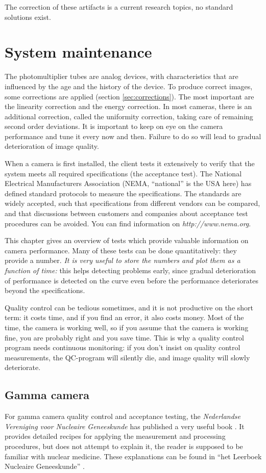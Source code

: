 \documentclass[11pt,oneside]{book}
\begin{document}
The correction of these artifacts is a current research topics, no standard
solutions exist.

\chapter{System maintenance}

The photomultiplier tubes are analog devices, with characteristics
that are influenced by the age and the history of the device. To
produce correct images, some corrections are applied (section
\ref{sec:corrections}). The most important are the linearity
correction and the energy correction. In most cameras, there is an
additional correction, called the uniformity correction, taking care
of remaining second order deviations. It is important to keep on eye
on the camera performance and tune it every now and then. Failure to
do so will lead to gradual deterioration of image quality.

When a camera is first installed, the client tests it extensively to
verify that the system meets all required specifications (the
acceptance test). The National Electrical Manufacturers Association
(NEMA, ``national'' is the USA here) has defined standard protocols to
measure the specifications. The standards are widely accepted, such
that specifications from different vendors can be compared, and that
discussions between customers and companies about acceptance test
procedures can be avoided. You can find information on {\em
http://www.nema.org}.

This chapter gives an overview of tests which provide valuable information on
camera performance. Many of these tests can be done quantitatively: they
provide a number. {\em It is very useful to store the numbers and plot them as
a function of time:} this helps detecting problems early, since gradual
deterioration of performance is detected on the curve even before the
performance deteriorates beyond the specifications.

Quality control can be tedious sometimes, and it is not productive on
the short term: it costs time, and if you find an error, it also costs
money. Most of the time, the camera is working well, so if you assume
that the camera is working fine, you are probably right and you save
time. This is why a quality control program needs continuous
monitoring: if you don't insist on quality control measurements, the
QC-program will silently die, and image quality will slowly
deteriorate.

\section{Gamma camera}
For gamma camera quality control and acceptance testing, the {\em Nederlandse
Vereniging voor Nucleaire Geneeskunde} has published a very useful book
\cite{Aanbevelingen}. It provides detailed recipes for applying the
measurement and processing procedures, but does not attempt to explain it, the
reader is supposed to be familiar with nuclear medicine. These explanations
can be found in ``het Leerboek Nucleaire Geneeskunde'' \cite{Leerboek}.
\end{document}
